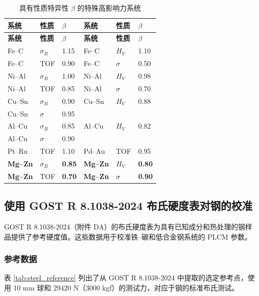 \documentclass[12pt,a4paper]{article}
\begin{document}
	\begin{longtable}{p{2.2cm} p{2.2cm} p{1.2cm} p{2.2cm} p{2.2cm} p{1.2cm}}
		\caption{具有性质特异性 $\beta$ 的特殊高影响力系统}\label{tab:beta_special}\\
		\toprule
		\textbf{系统} & \textbf{性质} & $\beta$ & \textbf{系统} & \textbf{性质} & $\beta$ \\
		\midrule
		\endfirsthead
		\toprule
		\textbf{系统} & \textbf{性质} & $\beta$ & \textbf{系统} & \textbf{性质} & $\beta$ \\
		\midrule
		\endhead
		Fe–C  & $\sigma_B$ & 1.15 & Fe–C  & $H_V$ & 1.10 \\
		Fe–C  & TOF & 0.90 & Fe–C  & $\sigma$ & 0.50 \\
		Ni–Al & $\sigma_B$ & 1.00 & Ni–Al & $H_V$ & 0.98 \\
		Ni–Al & TOF & 0.85 & Ni–Al & $\sigma$ & 0.70 \\
		Cu–Sn & $\sigma_B$ & 0.90 & Cu–Sn & $H_V$ & 0.88 \\
		Cu–Sn & $\sigma$ & 0.95 & & & \\
		Al–Cu & $\sigma_B$ & 0.85 & Al–Cu & $H_V$ & 0.82 \\
		Al–Cu & $\sigma$ & 0.90 & & & \\
		Pt–Ru & TOF & 1.10 & Pd–Au & TOF & 0.95 \\
		\rowcolor{gray!10}
		\textbf{Mg–Zn} & $\sigma_B$ & \textbf{0.85} & \textbf{Mg–Zn} & $H_V$ & \textbf{0.80} \\
		\textbf{Mg–Zn} & TOF & \textbf{0.70} & \textbf{Mg–Zn} & $\sigma$ & \textbf{0.90} \\
		\bottomrule
	\end{longtable}
	
	
	\subsection{使用 GOST R 8.1038-2024 布氏硬度表对钢的校准}
	\label{subsec:steel_calibration}
	
	GOST R 8.1038-2024（附件 DA）的布氏硬度表为具有已知成分和热处理的钢样品提供了参考硬度值。这些数据用于校准铁–碳和低合金钢系统的 PLCM 参数。
	
	\subsubsection{参考数据}
	表 \ref{tab:steel_reference} 列出了从 GOST R 8.1038-2024 中提取的选定参考点，使用 10 mm 球和 29420 N（3000 kgf）的测试力，对应于钢的标准布氏测试。
	
\end{document}
